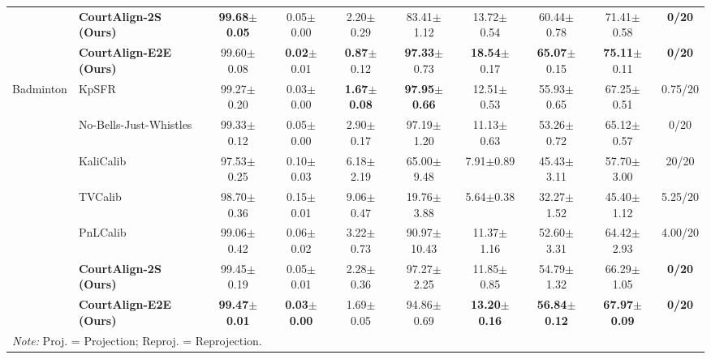 \begin{table}[t!]
{\begin{tabular}{llcccccccc}
\rowcolor{blue!5}\cellcolor{white}
& \textbf{CourtAlign-2S (Ours)} & \textbf{99.68{\tiny$\pm$0.05}} & 0.05{\tiny$\pm$0.00} & 2.20{\tiny$\pm$0.29} & 83.41{\tiny$\pm$1.12} & 13.72{\tiny$\pm$0.54} & 60.44{\tiny$\pm$0.78} & 71.41{\tiny$\pm$0.58} & \textbf{0/20} \\
\rowcolor{blue!5}\cellcolor{white}
& \textbf{CourtAlign-E2E (Ours)} & 99.60{\tiny$\pm$0.08} & \textbf{0.02}{\tiny$\pm$0.01} & \textbf{0.87}{\tiny$\pm$0.12} & \textbf{97.33}{\tiny$\pm$0.73} & \textbf{18.54}{\tiny$\pm$0.17} & \textbf{65.07}{\tiny$\pm$0.15} & \textbf{75.11}{\tiny$\pm$0.11} & \textbf{0/20} \\
\midrule
\multirow{7}{*}{Badminton}
& KpSFR~\cite{chu2022sports} & 99.27{\tiny$\pm$0.20} & 0.03{\tiny$\pm$0.00} & \textbf{1.67{\tiny$\pm$0.08}} & \textbf{97.95{\tiny$\pm$0.66}} & 12.51{\tiny$\pm$0.53} & 55.93{\tiny$\pm$0.65} & 67.25{\tiny$\pm$0.51} & 0.75/20 \\
& No-Bells-Just-Whistles~\cite{Gutierrez-Perez_2024_CVPR} & 99.33{\tiny$\pm$0.12} & 0.05{\tiny$\pm$0.00} & 2.90{\tiny$\pm$0.17} & 97.19{\tiny$\pm$1.20} & 11.13{\tiny$\pm$0.63} & 53.26{\tiny$\pm$0.72} & 65.12{\tiny$\pm$0.57} & 0/20 \\
& KaliCalib~\cite{maglo2022kalicalib} & 97.53{\tiny$\pm$0.25} & 0.10{\tiny$\pm$0.03} & 6.18{\tiny$\pm$2.19} & 65.00{\tiny$\pm$9.48} & 7.91{\tiny$\pm$0.89} & 45.43{\tiny$\pm$3.11} & 57.70{\tiny$\pm$3.00} & 20/20 \\
& TVCalib~\cite{theiner2023tvcalib} & 98.70{\tiny$\pm$0.36} & 0.15{\tiny$\pm$0.01} & 9.06{\tiny$\pm$0.47} & 19.76{\tiny$\pm$3.88} & 5.64{\tiny$\pm$0.38} & 32.27{\tiny$\pm$1.52} & 45.40{\tiny$\pm$1.12} & 5.25/20 \\
& PnLCalib~\cite{gutierrez2026pnlcalib} & 99.06{\tiny$\pm$0.42} & 0.06{\tiny$\pm$0.02} & 3.22{\tiny$\pm$0.73} & 90.97{\tiny$\pm$10.43} & 11.37{\tiny$\pm$1.16} & 52.60{\tiny$\pm$3.31} & 64.42{\tiny$\pm$2.93} & 4.00/20 \\
\rowcolor{blue!5}\cellcolor{white}
& \textbf{CourtAlign-2S (Ours)} & 99.45{\tiny$\pm$0.19} & 0.05{\tiny$\pm$0.01} & 2.28{\tiny$\pm$0.36} & 97.27{\tiny$\pm$2.25} & 11.85{\tiny$\pm$0.85} & 54.79{\tiny$\pm$1.32} & 66.29{\tiny$\pm$1.05} & \textbf{0/20} \\
\rowcolor{blue!5}\cellcolor{white}
& \textbf{CourtAlign-E2E (Ours)}
& \textbf{99.47{\tiny$\pm$0.01}}
& \textbf{0.03{\tiny$\pm$0.00}}
& 1.69{\tiny$\pm$0.05}
& 94.86{\tiny$\pm$0.69}
& \textbf{13.20{\tiny$\pm$0.16}}
& \textbf{56.84{\tiny$\pm$0.12}}
& \textbf{67.97{\tiny$\pm$0.09}}
& \textbf{0/20} \\
\bottomrule
\multicolumn{10}{l}{\scriptsize \textit{Note:} Proj. = Projection; Reproj. = Reprojection.} \\
\end{tabular}%
}
\end{table}
